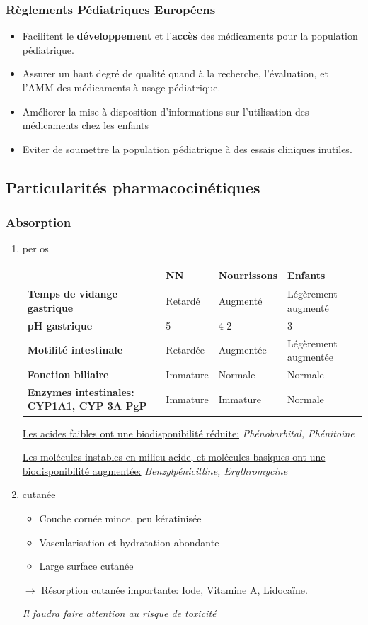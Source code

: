 \documentclass[11pt]{article}
\begin{document}
\subsubsection{Règlements Pédiatriques Européens}
\label{sec:orga162888}
\begin{itemize}
\item Facilitent le \textbf{développement} et l'\textbf{accès} des médicaments pour la population pédiatrique.
\item Assurer un haut degré de qualité quand à la recherche, l'évaluation, et l'AMM des médicaments à usage pédiatrique.
\item Améliorer la mise à disposition d'informations sur l'utilisation des médicaments chez les enfants
\item Eviter de soumettre la population pédiatrique à des essais cliniques inutiles.
\end{itemize}
\subsection{Particularités pharmacocinétiques}
\label{sec:org340d846}
\subsubsection{Absorption}
\label{sec:org84c43ba}
\begin{enumerate}
\item per os
\label{sec:org0985bc5}
\begin{center}
\begin{tabular}{llll}
 & NN & Nourrissons & Enfants\\
\hline
\textbf{Temps de vidange gastrique} & Retardé & Augmenté & Légèrement augmenté\\
\textbf{pH gastrique} & 5 & 4-2 & 3\\
\textbf{Motilité intestinale} & Retardée & Augmentée & Légèrement augmentée\\
\textbf{Fonction biliaire} & Immature & Normale & Normale\\
\textbf{Enzymes intestinales: CYP1A1, CYP 3A PgP} & Immature & Immature & Normale\\
\end{tabular}
\end{center}
\uline{Les acides faibles ont une biodisponibilité réduite:} \emph{Phénobarbital, Phénitoïne}

\uline{Les molécules instables en milieu acide, et molécules basiques  ont une biodisponibilité augmentée:} \emph{Benzylpénicilline, Erythromycine}
\item cutanée
\label{sec:org07719a5}
\begin{itemize}
\item Couche cornée mince, peu kératinisée
\item Vascularisation et hydratation abondante
\item Large surface cutanée
\end{itemize}
\(\to\) Résorption cutanée importante: Iode, Vitamine A, Lidocaïne.

\emph{Il faudra faire attention au risque de toxicité}
\end{enumerate}
\end{document}
